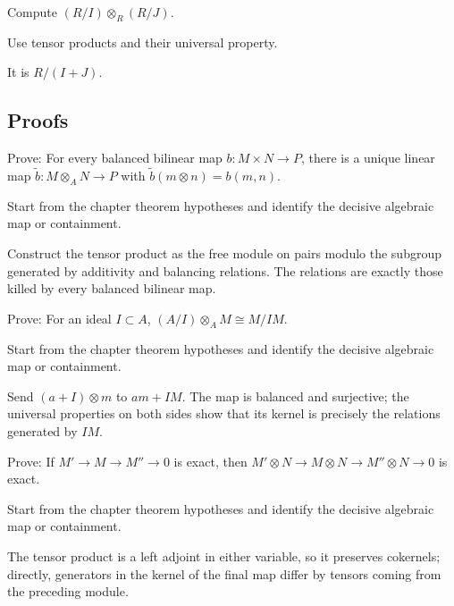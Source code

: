 \begin{exercise}\label{exr:v10-expand-05}
Compute $(R/I)\otimes_R(R/J)$.
\end{exercise}
\begin{hint}
Use tensor products and their universal property.
\end{hint}
\begin{solution}
It is $R/(I+J)$.
\end{solution}

\subsection*{Proofs}

\begin{exercise}\label{exr:v10-expand-06}
Prove: For every balanced bilinear map $b:M\times N\to P$, there is a unique linear map $\widetilde b:M\otimes_A N\to P$ with $\widetilde b(m\otimes n)=b(m,n)$.
\end{exercise}
\begin{hint}
Start from the chapter theorem hypotheses and identify the decisive algebraic map or containment.
\end{hint}
\begin{solution}
Construct the tensor product as the free module on pairs modulo the subgroup generated by additivity and balancing relations. The relations are exactly those killed by every balanced bilinear map.
\end{solution}

\begin{exercise}\label{exr:v10-expand-07}
Prove: For an ideal $I\subset A$, $(A/I)\otimes_A M\cong M/IM$.
\end{exercise}
\begin{hint}
Start from the chapter theorem hypotheses and identify the decisive algebraic map or containment.
\end{hint}
\begin{solution}
Send $(a+I)\otimes m$ to $am+IM$. The map is balanced and surjective; the universal properties on both sides show that its kernel is precisely the relations generated by $I M$.
\end{solution}

\begin{exercise}\label{exr:v10-expand-08}
Prove: If $M'\to M\to M''\to0$ is exact, then $M'\otimes N\to M\otimes N\to M''\otimes N\to0$ is exact.
\end{exercise}
\begin{hint}
Start from the chapter theorem hypotheses and identify the decisive algebraic map or containment.
\end{hint}
\begin{solution}
The tensor product is a left adjoint in either variable, so it preserves cokernels; directly, generators in the kernel of the final map differ by tensors coming from the preceding module.
\end{solution}

